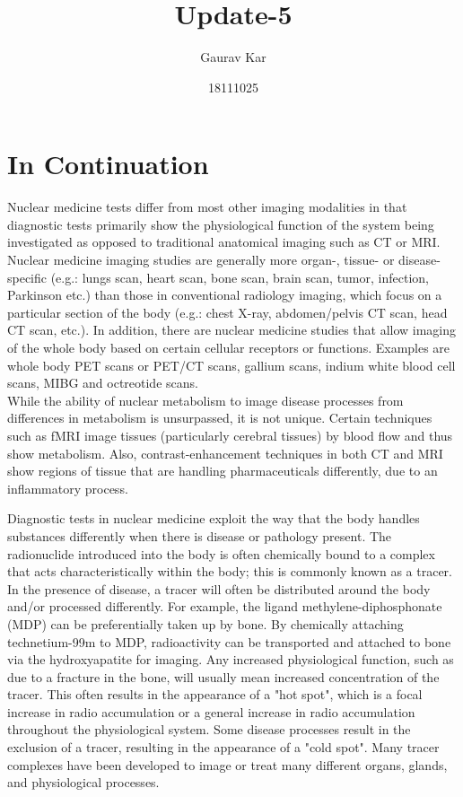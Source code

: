 \documentclass{article}
\title{Update-5}
\author{Gaurav Kar}
\date{18111025}
\begin{document}
\maketitle

\section{In Continuation}
Nuclear medicine tests differ from most other imaging modalities in that diagnostic tests primarily show the physiological function of the system being investigated as opposed to traditional anatomical imaging such as CT or MRI. Nuclear medicine imaging studies are generally more organ-, tissue- or disease-specific (e.g.: lungs scan, heart scan, bone scan, brain scan, tumor, infection, Parkinson etc.) than those in conventional radiology imaging, which focus on a particular section of the body (e.g.: chest X-ray, abdomen/pelvis CT scan, head CT scan, etc.). In addition, there are nuclear medicine studies that allow imaging of the whole body based on certain cellular receptors or functions. Examples are whole body PET scans or PET/CT scans, gallium scans, indium white blood cell scans, MIBG and octreotide scans.\\While the ability of nuclear metabolism to image disease processes from differences in metabolism is unsurpassed, it is not unique. Certain techniques such as fMRI image tissues (particularly cerebral tissues) by blood flow and thus show metabolism. Also, contrast-enhancement techniques in both CT and MRI show regions of tissue that are handling pharmaceuticals differently, due to an inflammatory process.

Diagnostic tests in nuclear medicine exploit the way that the body handles substances differently when there is disease or pathology present. The radionuclide introduced into the body is often chemically bound to a complex that acts characteristically within the body; this is commonly known as a tracer. In the presence of disease, a tracer will often be distributed around the body and/or processed differently. For example, the ligand methylene-diphosphonate (MDP) can be preferentially taken up by bone. By chemically attaching technetium-99m to MDP, radioactivity can be transported and attached to bone via the hydroxyapatite for imaging. Any increased physiological function, such as due to a fracture in the bone, will usually mean increased concentration of the tracer. This often results in the appearance of a "hot spot", which is a focal increase in radio accumulation or a general increase in radio accumulation throughout the physiological system. Some disease processes result in the exclusion of a tracer, resulting in the appearance of a "cold spot". Many tracer complexes have been developed to image or treat many different organs, glands, and physiological processes.
\end{document}
